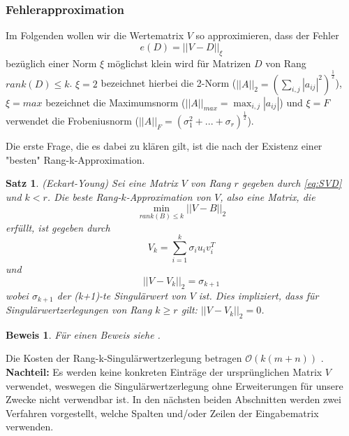 \documentclass[12pt,a4paper,twoside]{article}
\newtheorem{Satz}{Satz}[section]
\newtheorem{Beweis}{Beweis}
\begin{document}
		\subsubsection{Fehlerapproximation}
		Im Folgenden wollen wir die Wertematrix $V$ so approximieren, dass der Fehler 
		\begin{equation*}
			e(D)=||V-D||_\xi
		\end{equation*}
		bezüglich einer Norm $\xi$ möglichst klein wird für Matrizen $D$ von Rang $rank(D)\leq k$. $\xi=2$ bezeichnet hierbei die 2-Norm ($||A||_2=\left(\sum_{i,j}|a_{ij}|^2\right)^\frac{1}{2}$), $\xi=max$ bezeichnet die Maximumsnorm ($||A||_{max}=\max_{i,j}|a_{ij}|$) und $\xi=F$ verwendet die Frobeniusnorm ($||A||_F=(\sigma_1^2+...+\sigma_r)^\frac{1}{2}$).
		\newline

		Die erste Frage, die es dabei zu klären gilt, ist die nach der Existenz einer  "besten" Rang-k-Approximation.
		\begin{Satz}{(Eckart-Young)}
			Sei eine Matrix $V$ von Rang $r$ gegeben durch \ref{eq:SVD} und $k<r$. Die beste Rang-$k$-Approximation 
			von $V$, also eine Matrix, die
			\begin{equation*}
				\min_{rank(B)\leq k}||V-B||_2	
			\end{equation*}		
			erfüllt, ist gegeben durch
			\begin{equation*}
				 V_k=\sum_{i=1}^k\sigma_i u_i v_i^T
			\end{equation*}
			und 
			\begin{equation*}
				||V-V_k||_2=\sigma_{k+1}
			\end{equation*}
			wobei $\sigma_{k+1}$ der (k+1)-te Singulärwert von $V$ ist. Dies impliziert, dass für Singulärwertzerlegungen von Rang $k\geq r$ gilt: $||V-V_k||_2=0$.
		\end{Satz}
		\begin{Beweis}
			Für einen Beweis siehe \cite{Golub2013}.
		\end{Beweis}
		Die Kosten der Rang-k-Singulärwertzerlegung betragen $\mathcal{O}(k(m+n))$ \citep{Drineas2006}. \newline
		\newline
		\textbf{Nachteil:} Es werden keine konkreten Einträge der ursprünglichen Matrix $V$ verwendet, weswegen die Singulärwertzerlegung ohne Erweiterungen für unsere Zwecke nicht verwendbar ist.\newline
		\newline
		In den nächsten beiden Abschnitten werden zwei Verfahren vorgestellt, welche Spalten und/oder Zeilen der 
		Eingabematrix verwenden.
\end{document}
